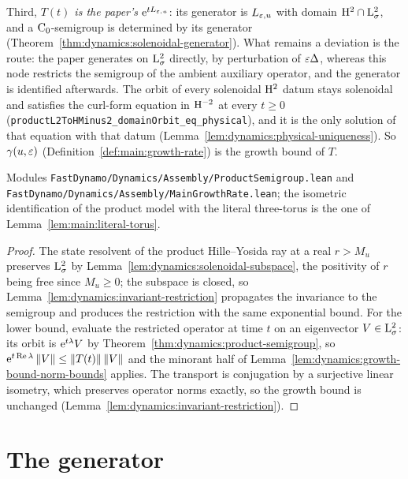 Third, \emph{$T(t)$ is the paper's $\mathrm{e}^{tL_{\varepsilon,u}}$}: its generator is $L_{\varepsilon,u}$ with
domain $\mathrm{H}^2\cap\mathrm{L}^2_\sigma$, and a $\mathrm{C}_0$-semigroup is determined by its generator
(Theorem~\ref{thm:dynamics:solenoidal-generator}).  What remains a deviation is the route: the
paper generates on $\mathrm{L}^2_\sigma$ directly, by perturbation of $\varepsilon\Delta$, whereas this node
restricts the semigroup of the ambient auxiliary operator, and the generator is identified
afterwards.  The orbit of every solenoidal $\mathrm{H}^2 $ datum stays solenoidal and satisfies the
curl-form equation in $\mathrm{H}^{-2} $ at every $t\geq0 $
(\texttt{productL2ToHMinus2\_domainOrbit\_eq\_physical}), and it is the only solution of that
equation with that datum (Lemma~\ref{lem:dynamics:physical-uniqueness}).  So
$\gamma(u,\varepsilon)$ (Definition~\ref{def:main:growth-rate}) is the growth bound of $T $.

Modules \texttt{FastDynamo/Dynamics/Assembly/ProductSemigroup.lean} and
\texttt{FastDynamo/Dynamics/Assembly/MainGrowthRate.lean}; the isometric identification of
the product model with the literal three-torus is the one of
Lemma~\ref{lem:main:literal-torus}.

\begin{proof}
  \leanok
  The state resolvent of the product Hille--Yosida ray at a real $r>M_u $ preserves
  $\mathrm{L}^2_\sigma $ by Lemma~\ref{lem:dynamics:solenoidal-subspace}, the positivity of $r $
  being free since $M_u\geq0 $; the subspace is closed, so
  Lemma~\ref{lem:dynamics:invariant-restriction} propagates the invariance to the semigroup
  and produces the restriction with the same exponential bound.  For the lower bound,
  evaluate the restricted operator at time $t $ on an eigenvector $V\in\mathrm{L}^2_\sigma $: its
  orbit is $\mathrm{e}^{t\lambda}V $ by Theorem~\ref{thm:dynamics:product-semigroup}, so
  $\mathrm{e}^{t\operatorname{Re}\lambda}\left\|V\right\|\leq\left\|T(t)\right\|\left\|V\right\| $ and the minorant half of
  Lemma~\ref{lem:dynamics:growth-bound-norm-bounds} applies.  The transport is conjugation by
  a surjective linear isometry, which preserves operator norms exactly, so the growth bound
  is unchanged (Lemma~\ref{lem:dynamics:invariant-restriction}).
\end{proof}

\section{The generator}
\label{sec:dynamics:generator}

